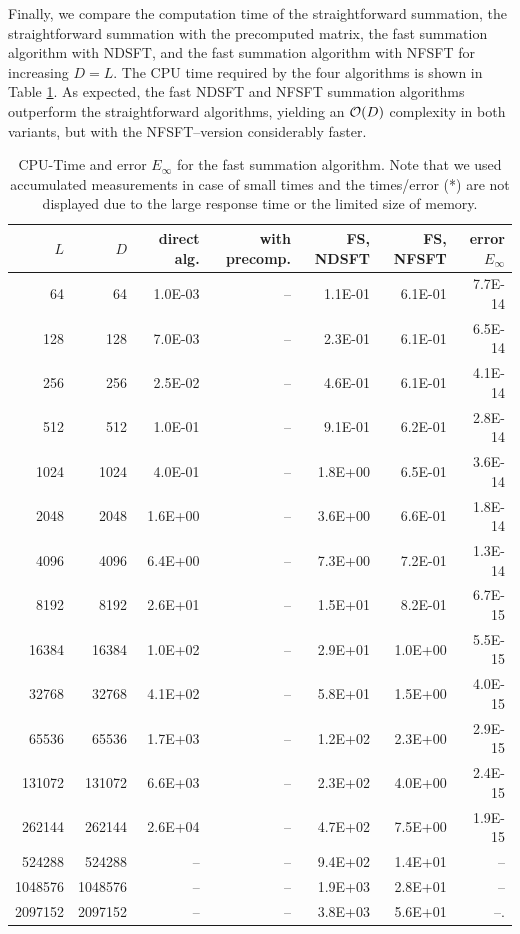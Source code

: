 \documentclass[11pt,a4paper,twoside,bibtotoc]{scrartcl}
\theoremstyle{plain}
\theoremstyle{definition}
\theoremstyle{remark}
\numberwithin{equation}{section}
\numberwithin{table}{section}
\numberwithin{figure}{section}
\begin{document}
Finally, we compare the computation time of the straightforward summation, the
straightforward summation with the precomputed matrix, the fast summation
algorithm with NDSFT, and the fast summation algorithm with NFSFT for
increasing $D=L$. 
The CPU time required by the four algorithms is shown in Table
\ref{tab:TimeSpace}. 
As expected, the fast NDSFT and NFSFT summation algorithms outperform the 
straightforward algorithms, yielding an ${\cal O}(D)$ complexity in both 
variants, but with the NFSFT--version considerably faster.

\begin{table}[ht!]
  \begin{center}
    \begin{tabular}{r|r|r|r|r|r|r}
    $L$ & $D$ & direct alg. & with precomp. & FS, NDSFT & FS, NFSFT & error $E_{\infty}$\\\hline
        64 &     64 & 1.0E-03 & -- & 1.1E-01 & 6.1E-01 & 7.7E-14\\
       128 &    128 & 7.0E-03 & -- & 2.3E-01 & 6.1E-01 & 6.5E-14\\
       256 &    256 & 2.5E-02 & -- & 4.6E-01 & 6.1E-01 & 4.1E-14\\
       512 &    512 & 1.0E-01 & -- & 9.1E-01 & 6.2E-01 & 2.8E-14\\
      1024 &   1024 & 4.0E-01 & -- & 1.8E+00 & 6.5E-01 & 3.6E-14\\
      2048 &   2048 & 1.6E+00 & -- & 3.6E+00 & 6.6E-01 & 1.8E-14\\
      4096 &   4096 & 6.4E+00 & -- & 7.3E+00 & 7.2E-01 & 1.3E-14\\
      8192 &   8192 & 2.6E+01 & -- & 1.5E+01 & 8.2E-01 & 6.7E-15\\
     16384 &  16384 & 1.0E+02 & -- & 2.9E+01 & 1.0E+00 & 5.5E-15\\
     32768 &  32768 & 4.1E+02 & -- & 5.8E+01 & 1.5E+00 & 4.0E-15\\
     65536 &  65536 & 1.7E+03 & -- & 1.2E+02 & 2.3E+00 & 2.9E-15\\
    131072 & 131072 & 6.6E+03 & -- & 2.3E+02 & 4.0E+00 & 2.4E-15\\
    262144 & 262144 & 2.6E+04 & -- & 4.7E+02 & 7.5E+00 & 1.9E-15\\
    524288 & 524288 & -- & -- & 9.4E+02 & 1.4E+01 & --\\
    1048576 & 1048576 & -- & -- & 1.9E+03 & 2.8E+01 & --\\
    2097152 & 2097152 & -- & -- & 3.8E+03 & 5.6E+01 & --.\\
    \end{tabular}
  \end{center}
  \caption{CPU-Time and error $E_{\infty}$ for the fast summation algorithm.
    Note that we used accumulated measurements in case of small times and the
    times/error (*) are not displayed due to the large response time or the 
    limited size of memory.}
  \label{tab:TimeSpace}
\end{table}
\end{document}
